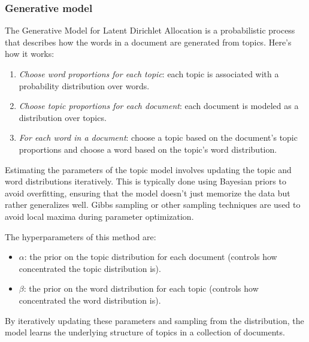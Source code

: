 \subsubsection{Generative model}
The Generative Model for Latent Dirichlet Allocation is a probabilistic process that describes how the words in a document are generated from topics. 
Here's how it works:
\begin{enumerate}
    \item \textit{Choose word proportions for each topic}: each topic is associated with a probability distribution over words.
    \item \textit{Choose topic proportions for each document}: each document is modeled as a distribution over topics.
    \item \textit{For each word in a document}: choose a topic based on the document's topic proportions and choose a word based on the topic's word distribution.
\end{enumerate}
\noindent Estimating the parameters of the topic model involves updating the topic and word distributions iteratively.
This is typically done using Bayesian priors to avoid overfitting, ensuring that the model doesn't just memorize the data but rather generalizes well.
Gibbs sampling or other sampling techniques are used to avoid local maxima during parameter optimization.

The hyperparameters of this method are: 
\begin{itemize}
    \item $\alpha$: the prior on the topic distribution for each document (controls how concentrated the topic distribution is).
    \item $\beta$: the prior on the word distribution for each topic (controls how concentrated the word distribution is).
\end{itemize}
By iteratively updating these parameters and sampling from the distribution, the model learns the underlying structure of topics in a collection of documents.